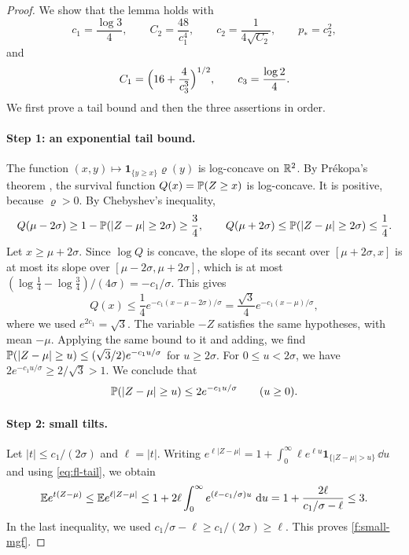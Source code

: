 \begin{proof}
We show that the lemma holds with
\[
 c_1=\frac{\log3}{4},\qquad C_2=\frac{48}{c_1^4},\qquad c_2=\frac{1}{4\sqrt{C_2}},\qquad p_*=c_2^2,
\]
and
\[
 C_1=\Bigl(16+\frac{4}{c_3^3}\Bigr)^{1/2},\qquad c_3=\frac{\log 2}{4}.
\]
We first prove a tail bound and then the three assertions in order.

\paragraph{Step 1: an exponential tail bound.} The function $(x,y)\mapsto\mathbf 1_{\{y\ge x\}}\varrho(y)$ is log-concave on $\mathbb R^2$. By Pr\'ekopa's theorem \cite[Theorems~6 and~8]{prekopa-1973}, the survival function $Q(x)=\mathbb P(Z\ge x)$ is log-concave. It is positive, because $\varrho>0$. By Chebyshev's inequality,
\[
 Q(\mu-2\sigma)\ge1-\mathbb P(|Z-\mu|\ge2\sigma)\ge\frac34,\qquad Q(\mu+2\sigma)\le\mathbb P(|Z-\mu|\ge2\sigma)\le\frac14.
\]
Let $x\ge\mu+2\sigma$. Since $\log Q$ is concave, the slope of its secant over $[\mu+2\sigma,x]$ is at most its slope over $[\mu-2\sigma,\mu+2\sigma]$, which is at most $(\log\frac14-\log\frac34)/(4\sigma)=-c_1/\sigma$. This gives
\[
 Q(x)\le\frac14e^{-c_1(x-\mu-2\sigma)/\sigma}=\frac{\sqrt3}{4}e^{-c_1(x-\mu)/\sigma},
\]
where we used $e^{2c_1}=\sqrt3$. The variable $-Z$ satisfies the same hypotheses, with mean $-\mu$. Applying the same bound to it and adding, we find $\mathbb P(|Z-\mu|\ge u)\le(\sqrt3/2)e^{-c_1u/\sigma}$ for $u\ge2\sigma$. For $0\le u<2\sigma$, we have $2e^{-c_1u/\sigma}\ge2/\sqrt3>1$. We conclude that
\begin{equation}\label{eq:fl-tail}
 \mathbb P(|Z-\mu|\ge u)\le2e^{-c_1u/\sigma}\qquad(u\ge0).
\end{equation}

\paragraph{Step 2: small tilts.} Let $|t|\le c_1/(2\sigma)$ and $\ell=|t|$. Writing $e^{\ell|Z-\mu|}=1+\int_0^\infty\ell e^{\ell u}\mathbf 1_{\{|Z-\mu|>u\}}\,\dd u$ and using \eqref{eq:fl-tail}, we obtain
\[
 \mathbb E e^{t(Z-\mu)}\le\mathbb E e^{\ell|Z-\mu|}\le1+2\ell\int_0^\infty e^{(\ell-c_1/\sigma)u}\,\,\mathrm d u
 =1+\frac{2\ell}{c_1/\sigma-\ell}\le3.
\]
In the last inequality, we used $c_1/\sigma-\ell\ge c_1/(2\sigma)\ge\ell$. This proves \eqref{f:small-mgf}.


\end{proof}
